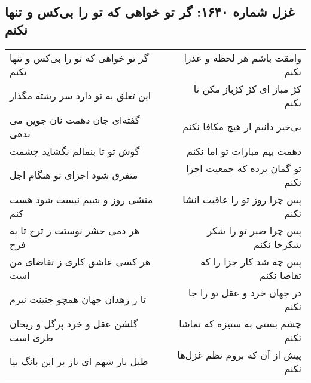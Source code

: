 \begin{center}
\section*{غزل شماره ۱۶۴۰: گر تو خواهی که تو را بی‌کس و تنها نکنم}
\label{sec:1640}
\begin{longtable}{l p{0.5cm} r}
گر تو خواهی که تو را بی‌کس و تنها نکنم
&&
وامقت باشم هر لحظه و عذرا نکنم
\\
این تعلق به تو دارد سر رشته مگذار
&&
کژ مباز ای کژ کژباز مکن تا نکنم
\\
گفته‌ای جان دهمت نان جوین می ندهی
&&
بی‌خبر دانیم ار هیچ مکافا نکنم
\\
گوش تو تا بنمالم نگشاید چشمت
&&
دهمت بیم مبارات تو اما نکنم
\\
متفرق شود اجزای تو هنگام اجل
&&
تو گمان برده که جمعیت اجزا نکنم
\\
منشی روز و شبم نیست شود هست کنم
&&
پس چرا روز تو را عاقبت انشا نکنم
\\
هر دمی حشر نوستت ز ترح تا به فرح
&&
پس چرا صبر تو را شکر شکرخا نکنم
\\
هر کسی عاشق کاری ز تقاضای من است
&&
پس چه شد کار جزا را که تقاضا نکنم
\\
تا ز زهدان جهان همچو جنینت نبرم
&&
در جهان خرد و عقل تو را جا نکنم
\\
گلشن عقل و خرد پرگل و ریحان طری است
&&
چشم بستی به ستیزه که تماشا نکنم
\\
طبل باز شهم ای باز بر این بانگ بیا
&&
پیش از آن که بروم نظم غزل‌ها نکنم
\\
\end{longtable}
\end{center}
